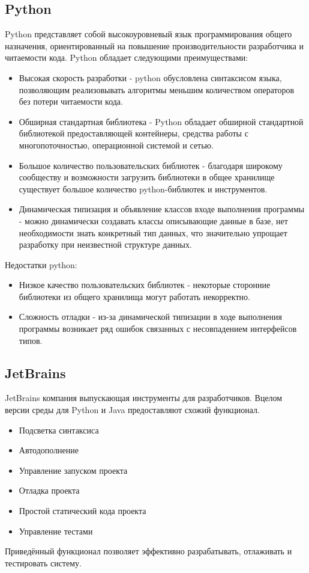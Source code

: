 \subsection{Python}
Python  представляет собой высокоуровневый язык программирования общего назначения, ориентированный на повышение производительности разработчика и читаемости кода.
Python обладает следующими преимуществами:
\begin{itemize}
\item Высокая скорость разработки - python обусловлена синтаксисом языка, позволяющим реализовывать алгоритмы меньшим количеством операторов без потери читаемости кода. 
\item Обширная стандартная библиотека - Python обладает обширной стандартной библиотекой предоставляющей контейнеры, средства работы с многопоточностью, операционной системой и сетью. 
\item Большое количество пользовательских библиотек - благодаря широкому сообществу и возможности загрузить библиотеки в общее хранилище существует большое количество python-библиотек и инструментов.
\item Динамическая типизация и объявление классов входе выполнения программы - можно динамически создавать классы описывающие данные в базе, нет необходимости знать конкретный тип данных, что значительно упрощает разработку при неизвестной структуре данных.   
\end{itemize}
Недостатки python:
\begin{itemize}
\item Низкое качество пользовательских библиотек - некоторые сторонние библиотеки из общего хранилища могут работать некорректно.
\item Сложность отладки - из-за динамической типизации в ходе выполнения программы возникает ряд ошибок связанных с несовпадением интерфейсов типов.
\end{itemize}
\subsection{JetBrains}
JetBrains компания выпускающая инструменты для разработчиков. Вцелом версии среды для Python и Java предоставляют схожий функционал.
\begin{itemize}
\item Подсветка синтаксиса
\item Автодополнение
\item Управление запуском проекта
\item Отладка проекта
\item Простой статический кода проекта
\item Управление тестами
\end{itemize}
Приведённый функционал позволяет эффективно разрабатывать, отлаживать и тестировать систему.
